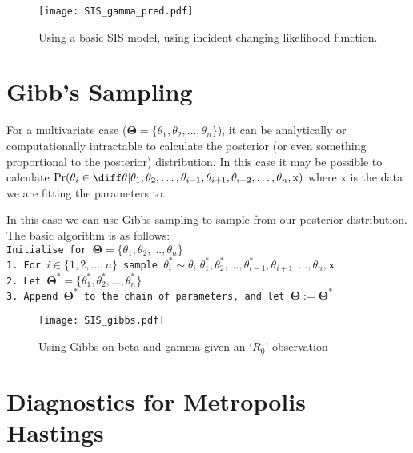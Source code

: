 \begin{figure}[ht]
    \centering
    \texttt{[image: SIS\_gamma\_pred.pdf]}
    \caption{Using a basic SIS model, using incident changing likelihood function.}
    \label{fig:SIS_MH_R}
\end{figure}

\section{Gibb's Sampling}

For a multivariate case ($\mathbf{\Theta} = \{\theta_1, \theta_2, \dots, \theta_n\}$), it can be analytically or computationally intractable to calculate the posterior (or even something proportional to the posterior) distribution. In this case it may be possible to calculate $\Pr(\theta_i\in\diff\theta|\theta_1, \theta_2, \dots, \theta_{i - 1}, \theta_{i+1}, \theta_{i+2}, \dots, \theta_n, \mathrm{x})$ where $\mathrm{x}$ is the data we are fitting the parameters to.

In this case we can use Gibbs sampling to sample from our posterior distribution. The basic algorithm is as follows:
\texttt{\\
    Initialise for $\mathbf{\Theta} = \{\theta_1, \theta_2, \dots, \theta_n\}$\\
    1. For $i\in\{1, 2, \dots, n\}$ sample $\theta_i^* \sim \theta_i|\theta_1^*, \theta_2^*, \dots, \theta_{i-1}^*, \theta_{i+1}, \dots, \theta_n, \mathbf{x}$\\
    2. Let $\mathbf{\Theta}^* = \{\theta_1^*, \theta_2^*, \dots, \theta_n^*\}$\\
    3. Append $\mathbf{\Theta}^*$ to the chain of parameters, and let $\mathbf{\Theta} := \mathbf{\Theta}^*$
}


\begin{figure}[ht]
    \centering
    \texttt{[image: SIS\_gibbs.pdf]}
    \caption{Using Gibbs on beta and gamma given an `$R_0$' observation}
    \label{fig:gibbs_R}
\end{figure}

\section{Diagnostics for Metropolis Hastings}
